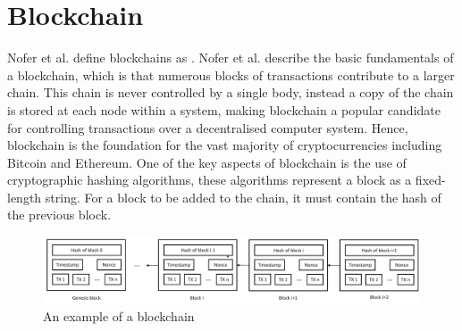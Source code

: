 \documentclass[a4paper, 11pt]{report}
\begin{document}
\section{Blockchain}
Nofer et al. define \gls{blockchain}s as  \cite{blockchain}. Nofer et al. describe the basic fundamentals of a \gls{blockchain}, which is that numerous blocks of transactions contribute to a larger chain. This chain is never controlled by a single body, instead a copy of the chain is stored at each node within a system, making \gls{blockchain} a popular candidate for controlling transactions over a decentralised computer system. Hence, \gls{blockchain} is the foundation for the vast majority of cryptocurrencies including Bitcoin\cite{bitcoin} and Ethereum\cite{ethereum}. One of the key aspects of \gls{blockchain} is the use of cryptographic \gls{hashing} algorithms, these algorithms represent a block as a fixed-length string. For a block to be added to the chain, it must contain the hash of the previous block.

\begin{center}
	\begin{figure}[H]
		\includegraphics[width=\textwidth,keepaspectratio]{NoferBlock}
		\caption{An example of a \gls{blockchain} \cite{blockchain}} 
		\label{fig:blockchain}
	\end{figure}
\end{center}

\end{document}
